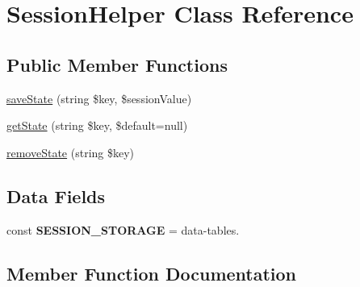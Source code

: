 \hypertarget{classhamburgscleanest_1_1_data_tables_1_1_helpers_1_1_session_helper}{}\section{Session\+Helper Class Reference}
\label{classhamburgscleanest_1_1_data_tables_1_1_helpers_1_1_session_helper}
\subsection*{Public Member Functions}
\begin{DoxyCompactItemize}
\item 
\hyperlink{classhamburgscleanest_1_1_data_tables_1_1_helpers_1_1_session_helper_a2b2f57e8efe838cbb1a61ffc3e1f1aa6}{save\+State} (string \$key, \$session\+Value)
\item 
\hyperlink{classhamburgscleanest_1_1_data_tables_1_1_helpers_1_1_session_helper_a213f24f847d58eb033424decc2039c62}{get\+State} (string \$key, \$default=null)
\item 
\hyperlink{classhamburgscleanest_1_1_data_tables_1_1_helpers_1_1_session_helper_a1672adb7d32dc37bdaeb0bd1ff92a0f7}{remove\+State} (string \$key)
\end{DoxyCompactItemize}
\subsection*{Data Fields}
\begin{DoxyCompactItemize}
\item 
\mbox{\label{classhamburgscleanest_1_1_data_tables_1_1_helpers_1_1_session_helper_a3f80c5b5eade75883410c851751a1420}} 
const {\bfseries S\+E\+S\+S\+I\+O\+N\+\_\+\+S\+T\+O\+R\+A\+GE} = \textquotesingle{}data-\/tables.\textquotesingle{}
\end{DoxyCompactItemize}


\subsection{Member Function Documentation}
\mbox{\label{classhamburgscleanest_1_1_data_tables_1_1_helpers_1_1_session_helper_a213f24f847d58eb033424decc2039c62}} 
